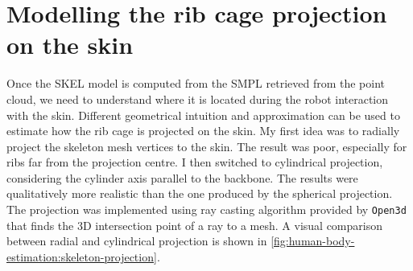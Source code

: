 \section{Modelling the rib cage projection on the skin}
Once the SKEL model is computed from the SMPL retrieved from the point cloud, we need to understand where it is located during the robot interaction with the skin. Different geometrical intuition and approximation can be used to estimate how the rib cage is projected on the skin. My first idea was to radially project the skeleton mesh vertices to the skin. The result was poor, especially for ribs far from the projection centre. I then switched to cylindrical projection, considering the cylinder axis parallel to the backbone. The results were qualitatively more realistic than the one produced by the spherical projection. The projection was implemented using ray casting algorithm provided by \verb|Open3d| that finds the 3D intersection point of a ray to a mesh. A visual comparison between radial and cylindrical projection is shown in \autoref{fig:human-body-estimation:skeleton-projection}.
